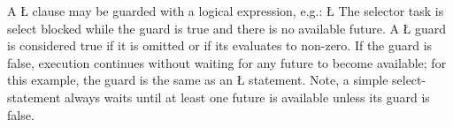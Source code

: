 \documentclass[openright,twoside]{report}
\begin{document}
A \LGinlinetrue\LGbegin\lgrinde\L{}\endlgrinde\LGend{} clause may be guarded with a logical expression, e.g.:
\LGinlinefalse\LGbegin\lgrinde
\L{}
\endlgrinde\LGend
{}%
The selector task is select blocked while the guard is true and there is no available future.
A \LGinlinetrue\LGbegin\lgrinde\L{}\endlgrinde\LGend{} guard is considered true if it is omitted or if its  evaluates to non-zero.
If the guard is false, execution continues without waiting for any future to become available;
for this example, the guard is the same as an \LGinlinetrue\LGbegin\lgrinde\L{}\endlgrinde\LGend{} statement.
Note, a simple select-statement always waits until at least one future is available unless its guard is false.
\end{document}
